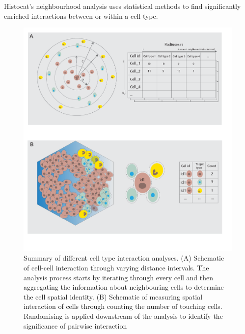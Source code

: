Histocat's neighbourhood analysis uses statistical methods to find significantly enriched interactions between or within a cell type. 
\begin{figure}
    \centering
    \includegraphics[width=0.85\columnwidth]{Chapter3/Figures/Conceptualise_CCC_analysis_cropped-01.png}
    \caption[Summary of different cell type interaction analyses.]{Summary of different cell type interaction analyses. (A) Schematic of cell-cell interaction through varying distance intervals. The analysis process starts by iterating through every cell and then aggregating the information about neighbouring cells to determine the cell spatial identity. (B) Schematic of measuring spatial interaction of cells through counting the number of touching cells. Randomising is applied downstream of the analysis to identify the significance of pairwise interaction}
    \label{fig:CCC_conceptualised}
\end{figure}

